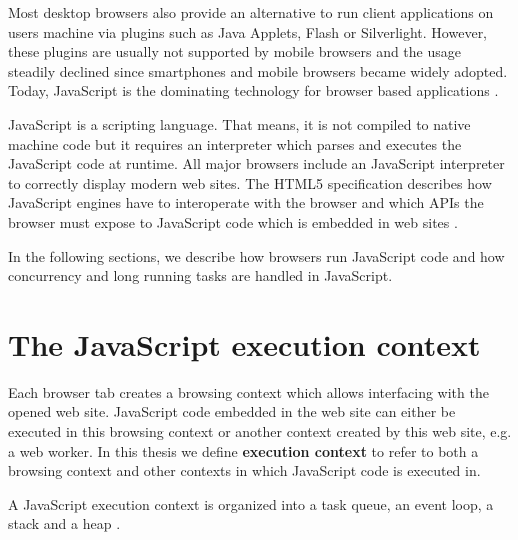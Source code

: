 \documentclass[
	ruledheaders=section,%
	class=report,%
	thesis={type=bachelor},%
	accentcolor=9c,%
	custommargins=true,%
	marginpar=false,%
	parskip=half-,%
	fontsize=11pt,%
]{tudapub}
\begin{document}
  Most desktop browsers also provide an alternative to run client applications on users machine via plugins such as Java Applets, Flash or Silverlight. However, these plugins are usually not supported by mobile browsers and the usage steadily declined since smartphones and mobile browsers became widely adopted. Today, JavaScript is the dominating technology for browser based applications \cite{browser-plugin-usage}.

  JavaScript is a scripting language. That means, it is not compiled to native machine code but it requires an interpreter which parses and executes the JavaScript code at runtime. All major browsers include an JavaScript interpreter to correctly display modern web sites. The HTML5 specification describes how JavaScript engines have to interoperate with the browser and which APIs the browser must expose to JavaScript code which is embedded in web sites \cite{html5-specification}.

  In the following sections, we describe how browsers run JavaScript code and how concurrency and long running tasks are handled in JavaScript.

  \section{The JavaScript execution context}

  Each browser tab creates a browsing context which allows interfacing with the opened web site. JavaScript code embedded in the web site can either be executed in this browsing context or another context created by this web site, e.g. a web worker. In this thesis we define \textbf{execution context} to refer to both a browsing context and other contexts in which JavaScript code is executed in.

  A JavaScript execution context is organized into a task queue, an event loop, a stack and a heap \cite{mdn-event-loop}.
\end{document}
